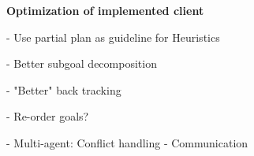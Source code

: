 \documentclass[Main]{subfiles}
\begin{document}
\textbf{Optimization of implemented client}

- Use partial plan as guideline for Heuristics

- Better subgoal decomposition

- "Better" back tracking

- Re-order goals?

- Multi-agent: Conflict handling
- Communication
\end{document}
